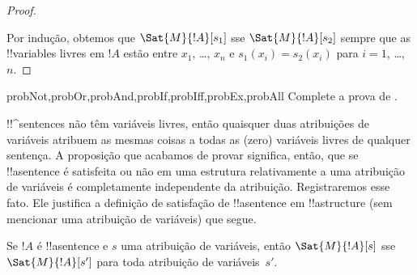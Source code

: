 \documentclass[../../../include/open-logic-section]{subfiles}
\begin{document}
\begin{proof}
\begin{enumerate}
\end{enumerate}
Por indução, obtemos que $\Sat{M}{!A}[s_1]$ sse $\Sat{M}{!A}[s_2]$
sempre que as !!{variable}s livres em $!A$ estão entre $x_1$, \dots, $x_n$
e $s_1(x_i)=s_2(x_i)$ para $i = 1$, \dots,~$n$.
\end{proof}

\begin{probtag}{probNot,probOr,probAnd,probIf,probIff,probEx,probAll}
Complete a prova de .
\end{probtag}

\begin{explain}
!!^{sentence}s não têm variáveis livres, então quaisquer duas atribuições de variáveis
atribuem as mesmas coisas a todas as (zero) variáveis livres de qualquer
sentença. A proposição que acabamos de provar significa, então, que se
!!a{sentence} é satisfeita ou não em uma estrutura relativamente a uma atribuição
de variáveis é completamente independente da atribuição. Registraremos
esse fato. Ele justifica a definição de satisfação de
!!a{sentence} em !!a{structure} (sem mencionar uma atribuição de
variáveis) que segue.
\end{explain}

\begin{cor}
Se $!A$ é !!a{sentence} e $s$ uma atribuição de variáveis, então
$\Sat{M}{!A}[s]$ sse $\Sat{M}{!A}[s']$ para toda atribuição de
variáveis~$s'$.
\end{cor}
\end{document}

